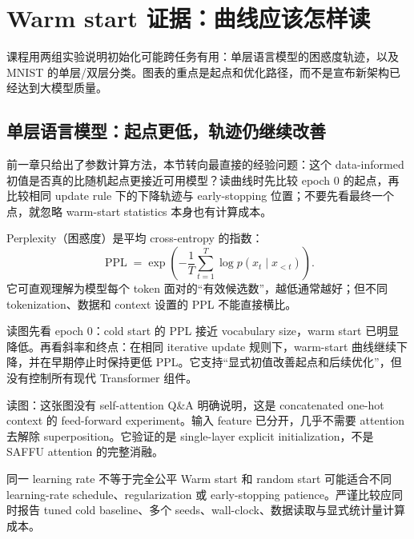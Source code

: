 \section{Warm start 证据：曲线应该怎样读}

课程用两组实验说明初始化可能跨任务有用：单层语言模型的困惑度轨迹，以及 MNIST 的单层/双层分类。图表的重点是起点和优化路径，而不是宣布新架构已经达到大模型质量。

\subsection{单层语言模型：起点更低，轨迹仍继续改善}

前一章只给出了参数计算方法，本节转向最直接的经验问题：这个 data-informed 初值是否真的比随机起点更接近可用模型？读曲线时先比较 epoch 0 的起点，再比较相同 update rule 下的下降轨迹与 early-stopping 位置；不要先看最终一个点，就忽略 warm-start statistics 本身也有计算成本。

Perplexity（困惑度）是平均 cross-entropy 的指数：
\[
\operatorname{PPL}=\exp\!\left(-\frac{1}{T}\sum_{t=1}^{T}\log p(x_t\mid x_{<t})\right).
\]
它可直观理解为模型每个 token 面对的“有效候选数”，越低通常越好；但不同 tokenization、数据和 context 设置的 PPL 不能直接横比。


读图先看 epoch 0：cold start 的 PPL 接近 vocabulary size，warm start 已明显降低。再看斜率和终点：在相同 iterative update 规则下，warm-start 曲线继续下降，并在早期停止时保持更低 PPL。它支持“显式初值改善起点和后续优化”，但没有控制所有现代 Transformer 组件。

\begin{knowledgebox}{读图：这张图没有 self-attention}
Q\&A 明确说明，这是 concatenated one-hot context 的 feed-forward experiment。输入 feature 已分开，几乎不需要 attention 去解除 superposition。它验证的是 single-layer explicit initialization，不是 SAFFU attention 的完整消融。
\end{knowledgebox}

\begin{warningbox}{同一 learning rate 不等于完全公平}
Warm start 和 random start 可能适合不同 learning-rate schedule、regularization 或 early-stopping patience。严谨比较应同时报告 tuned cold baseline、多个 seeds、wall-clock、数据读取与显式统计量计算成本。
\end{warningbox}

